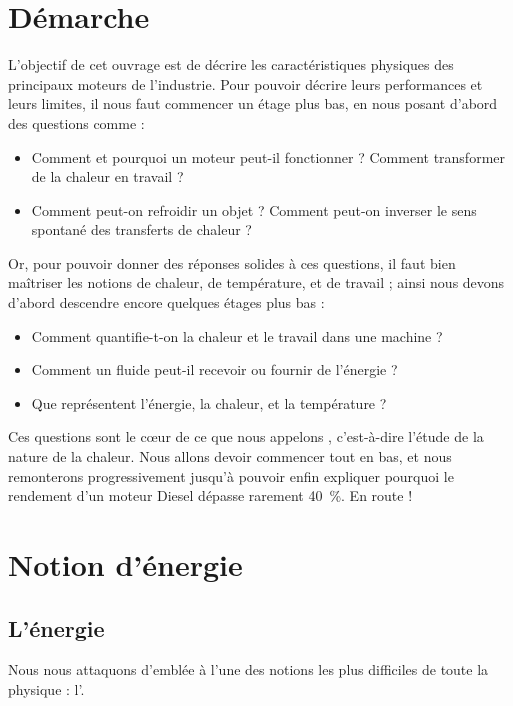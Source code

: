 \section{Démarche}

	L’objectif de cet ouvrage est de décrire les caractéristiques physiques des principaux moteurs de l’industrie. Pour pouvoir décrire leurs performances et leurs limites, il nous faut commencer un étage plus bas, en nous posant d’abord des questions comme :
	
		\begin{itemize}
			\item Comment et pourquoi un moteur peut-il fonctionner ? Comment transformer de la chaleur en travail ?
			\item Comment peut-on refroidir un objet ? Comment peut-on inverser le sens spontané des transferts de chaleur ?
		\end{itemize}

	Or, pour pouvoir donner des réponses solides à ces questions, il faut bien maîtriser les notions de chaleur, de température, et de travail ; ainsi nous devons d’abord descendre encore quelques étages plus bas :
	
		\begin{itemize}
			\item Comment quantifie-t-on la chaleur et le travail dans une machine ?
			\item Comment un fluide peut-il recevoir ou fournir de l’énergie ?
			\item Que représentent l’énergie, la chaleur, et la température ?
		\end{itemize}

	Ces questions sont le cœur de ce que nous appelons , c’est-à-dire l’étude de la nature de la chaleur. Nous allons devoir commencer tout en bas, et nous remonterons progressivement jusqu’à pouvoir enfin expliquer pourquoi le rendement d’un moteur Diesel dépasse rarement \SI{40}{\percent}. En route !
	
\section{Notion d’énergie}

	\subsection{L’énergie}
	
		Nous nous attaquons d’emblée à l’une des notions les plus difficiles de toute la physique : l’.
		
